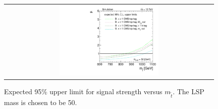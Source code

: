 \begin{figure}[!h]
  \centering
  \begin{tabular}{c}
                \includegraphics[width=0.49\textwidth]{figures/limitplot4BinSel_BaselineBTagTopTagTransverseMassMT2_LSP50.pdf} 
  \end{tabular}
  \caption{Expected 95\% upper limit for signal strength versus $m_{\tilde{t}}$. The LSP mass is chosen to be 50\gev.}
  \label{fig:stop_baselinetoptag_limit}
\end{figure}

